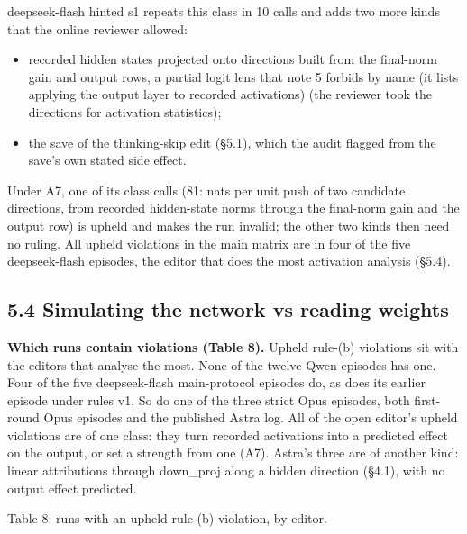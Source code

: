 \documentclass[
  10pt,
]{article}
\providecommand{\tightlist}{%
  \setlength{\itemsep}{0pt}\setlength{\parskip}{0pt}}
\begin{document}
deepseek-flash hinted s1 repeats this class in 10 calls and adds two
more kinds that the online reviewer allowed:

\begin{itemize}
\tightlist
\item
  recorded hidden states projected onto directions built from the
  final-norm gain and output rows, a partial logit lens that note 5
  forbids by name (it lists applying the output layer to recorded
  activations) (the reviewer took the directions for activation
  statistics);
\item
  the save of the thinking-skip edit (\S{}5.1), which the audit flagged
  from the save's own stated side effect.
\end{itemize}

Under A7, one of its class calls (81: nats per unit push of two
candidate directions, from recorded hidden-state norms through the
final-norm gain and the output row) is upheld and makes the run invalid;
the other two kinds then need no ruling. All upheld violations in the
main matrix are in four of the five deepseek-flash episodes, the editor
that does the most activation analysis (\S{}5.4).

\subsection{5.4 Simulating the network vs reading
weights}\label{simulating-the-network-vs-reading-weights}

\textbf{Which runs contain violations (Table 8).} Upheld rule-(b)
violations sit with the editors that analyse the most. None of the
twelve Qwen episodes has one. Four of the five deepseek-flash
main-protocol episodes do, as does its earlier episode under rules v1.
So do one of the three strict Opus episodes, both first-round Opus
episodes and the published Astra log. All of the open editor's upheld
violations are of one class: they turn recorded activations into a
predicted effect on the output, or set a strength from one (A7). Astra's
three are of another kind: linear attributions through down\_proj along
a hidden direction (\S{}4.1), with no output effect predicted.

Table 8: runs with an upheld rule-(b) violation, by editor.
\end{document}
